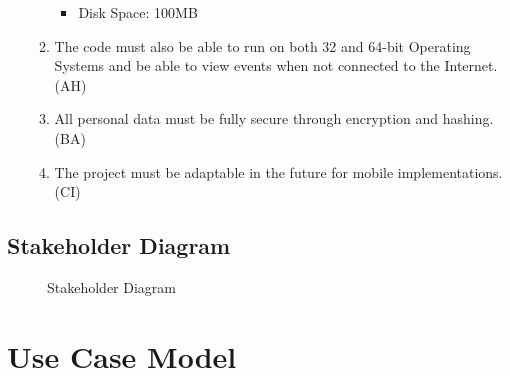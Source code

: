 \documentclass[a4paper]{article}
\begin{document}
\begin{enumerate}
\begin{enumerate}[label=NF\arabic*.]
\begin{itemize}
        \item Disk Space: 100MB
      \end{itemize}
      \item The code must also be able to run on both 32 and 64-bit Operating Systems and be able to view events when not connected to the Internet. (AH)
      \item All personal data must be fully secure through encryption and hashing. (BA)
      \item The project must be adaptable in the future for mobile implementations. (CI)
  \end{enumerate}
\end{enumerate}

\clearpage %
\subsection{Stakeholder Diagram}

\begin{figure}[!ht]
    \centering
    \caption{Stakeholder Diagram}
    \label{fig:stakeholder}
\end{figure}

\section{Use Case Model}
\end{document}

